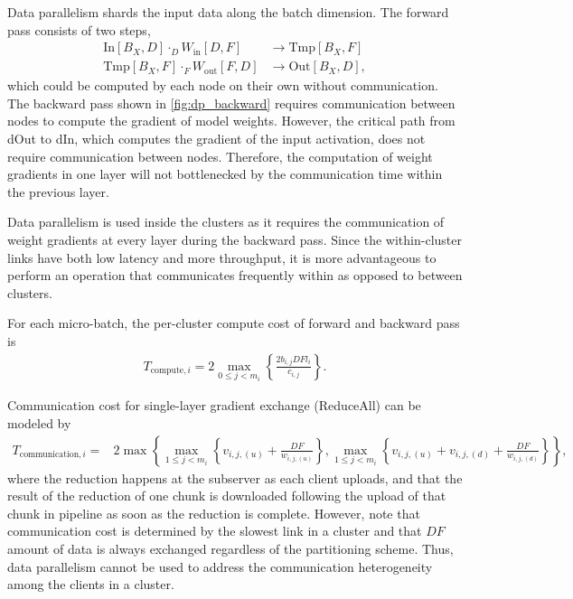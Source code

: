 \documentclass{article}
\begin{document}
Data parallelism \cite[Part 5]{scaling-book} shards the input data along the batch dimension. The forward pass consists of two steps,
\begin{align*}
    \text{In}[B_X, D] \cdot_D W_{\text{in}} [D, F] &\to \text{Tmp}[B_X, F] \\
    \text{Tmp}[B_X, F] \cdot_F W_{\text{out}} [F, D] &\to \text{Out}[B_X, D],
\end{align*}
which could be computed by each node on their own without communication. The backward pass shown in \ref{fig:dp_backward} requires communication between nodes to compute the gradient of model weights. However, the critical path from dOut to dIn, which computes the gradient of the input activation, does not require communication between nodes. Therefore, the computation of weight gradients in one layer will not bottlenecked by the communication time within the previous layer.

Data parallelism is used inside the clusters as it requires the communication of weight gradients at every layer during the backward pass. Since the within-cluster links have both low latency and more throughput, it is more advantageous to perform an operation that communicates frequently within as opposed to between clusters.

For each micro-batch, the per-cluster compute cost of forward and backward pass is
\begin{align}
    T_{\text{compute}, i} = 2\max_{0 \le j < m_i}\left\{\frac{2b_{i, j}DFl_i}{c_{i, j}}\right\}.
\end{align}

Communication cost for single-layer gradient exchange (ReduceAll) can be modeled by
\begin{align}
    T_{\text{communication}, i} =& 2\max\left\{\max_{1 \le j < m_i}\left\{v_{i,j, (u)} + \frac{DF}{w_{i, j, (u)}}\right\}, \max_{1 \le j < m_i}\left\{v_{i,j, (u)} + v_{i,j, (d)} + \frac{DF}{w_{i, j, (d)}}\right\}\right\},
\end{align}
where the reduction happens at the subserver as each client uploads, and that the result of the reduction of one chunk is downloaded following the upload of that chunk in pipeline as soon as the reduction is complete. However, note that communication cost is determined by the slowest link in a cluster and that $DF$ amount of data is always exchanged regardless of the partitioning scheme. Thus, data parallelism cannot be used to address the communication heterogeneity among the clients in a cluster.
\end{document}
